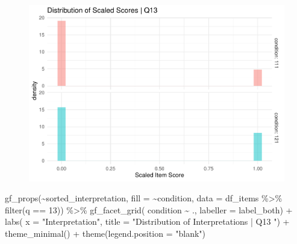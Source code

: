 \documentclass[
  letterpaper,
  DIV=11,
  numbers=noendperiod]{scrreprt}
\newenvironment{Shaded}{\begin{snugshade}}{\end{snugshade}}
\newcommand{\AttributeTok}[1]{\textcolor[rgb]{0.40,0.45,0.13}{#1}}
\newcommand{\DecValTok}[1]{\textcolor[rgb]{0.68,0.00,0.00}{#1}}
\newcommand{\FunctionTok}[1]{\textcolor[rgb]{0.28,0.35,0.67}{#1}}
\newcommand{\NormalTok}[1]{\textcolor[rgb]{0.00,0.23,0.31}{#1}}
\newcommand{\SpecialCharTok}[1]{\textcolor[rgb]{0.37,0.37,0.37}{#1}}
\newcommand{\StringTok}[1]{\textcolor[rgb]{0.13,0.47,0.30}{#1}}
\begin{document}
\begin{figure}[H]

{\centering \includegraphics{analysis/SGC3A/2_sgc3A_scoring_files/figure-pdf/Q13-distribution-1.pdf}

}

\end{figure}

\begin{Shaded}
\begin{Highlighting}[]
\FunctionTok{gf\_props}\NormalTok{(}\SpecialCharTok{\textasciitilde{}}\NormalTok{sorted\_interpretation, }\AttributeTok{fill =} \SpecialCharTok{\textasciitilde{}}\NormalTok{condition, }\AttributeTok{data =}\NormalTok{ df\_items }\SpecialCharTok{\%\textgreater{}\%} \FunctionTok{filter}\NormalTok{(q }\SpecialCharTok{==} \DecValTok{13}\NormalTok{)) }\SpecialCharTok{\%\textgreater{}\%}
  \FunctionTok{gf\_facet\_grid}\NormalTok{( condition }\SpecialCharTok{\textasciitilde{}}\NormalTok{ ., }\AttributeTok{labeller =}\NormalTok{ label\_both) }\SpecialCharTok{+} 
  \FunctionTok{labs}\NormalTok{( }\AttributeTok{x =} \StringTok{"Interpretation"}\NormalTok{, }\AttributeTok{title =} \StringTok{"Distribution of Interpretations | Q13 "}\NormalTok{) }\SpecialCharTok{+} 
  \FunctionTok{theme\_minimal}\NormalTok{() }\SpecialCharTok{+} \FunctionTok{theme}\NormalTok{(}\AttributeTok{legend.position =} \StringTok{"blank"}\NormalTok{)}
\end{Highlighting}
\end{Shaded}
\end{document}
